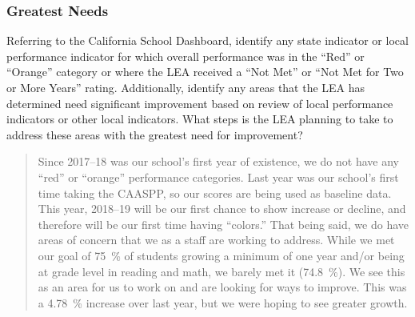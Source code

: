 \documentclass{article}
\newcounter{goal}[section] %
\begin{document}
\subsubsection{Greatest Needs}
Referring to the California School Dashboard, identify any state indicator or local performance indicator for which overall performance was in the ``Red'' or ``Orange'' category or where the LEA received a ``Not Met'' or ``Not Met for Two or More Years'' rating. Additionally, identify any areas that the LEA has determined need significant improvement based on review of local performance indicators or other local indicators. What steps is the LEA planning to take to address these areas with the greatest need for improvement?
\begin{quotation}
	Since 2017--18 was our school's first year of existence, we do not have any ``red'' or ``orange'' performance categories. Last year was our school's first time taking the CAASPP, so our scores are being used as baseline data. This year, 2018--19 will be our first chance to show increase or decline, and therefore will be our first time having ``colors.'' That being said, we do have areas of concern that we as a staff are working to address. While we met our goal of \SI{75}{\percent} of students growing a minimum of one year and/or being at grade level in reading and math, we barely met it (\SI{74.8}{\percent}). We see this as an area for us to work on and are looking for ways to improve. This was a \SI{4.78}{\percent} increase over last year, but we were hoping to see greater growth.
\end{quotation}
\end{document}
